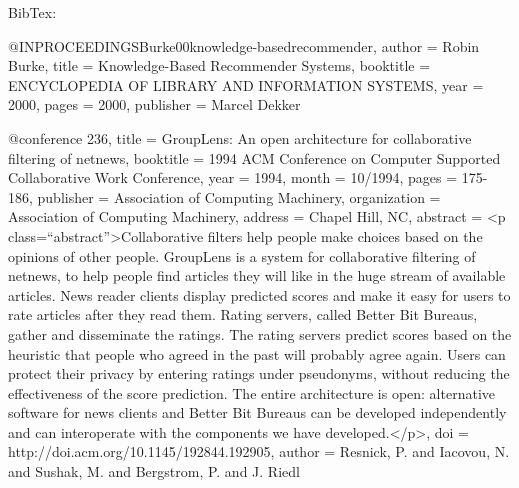 \begin{thebibliography}{9}
BibTex:

@INPROCEEDINGS{Burke00knowledge-basedrecommender,
author = {Robin Burke},
title = {Knowledge-Based Recommender Systems},
booktitle = {ENCYCLOPEDIA OF LIBRARY AND INFORMATION SYSTEMS},
year = {2000},
pages = {2000},
publisher = {Marcel Dekker}
}

@conference {236,
title = {GroupLens: An open architecture for collaborative filtering of netnews},
booktitle = {1994 ACM Conference on Computer Supported Collaborative Work Conference},
year = {1994},
month = {10/1994},
pages = {175-186},
publisher = {Association of Computing Machinery},
organization = {Association of Computing Machinery},
address = {Chapel Hill, NC},
abstract = {<p class=``abstract''>Collaborative filters help people make choices based on the opinions of other people. GroupLens is a system for collaborative filtering of netnews, to help people find articles they will like in the huge stream of available articles. News reader clients display predicted scores and make it easy for users to rate articles after they read them. Rating servers, called Better Bit Bureaus, gather and disseminate the ratings. The rating servers predict scores based on the heuristic that people who agreed in the past will probably agree again. Users can protect their privacy by entering ratings under pseudonyms, without reducing the effectiveness of the score prediction. The entire architecture is open: alternative software for news clients and Better Bit Bureaus can be developed independently and can interoperate with the components we have developed.</p>},
doi = {http://doi.acm.org/10.1145/192844.192905},
author = {Resnick, P. and Iacovou, N. and Sushak, M. and Bergstrom, P. and J. Riedl}
}


\fi

\end{thebibliography}

